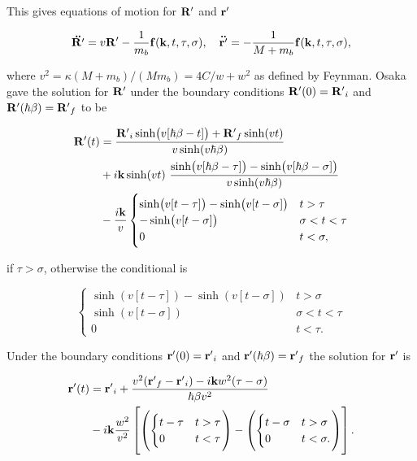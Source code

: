 This gives equations of motion for $\vb{R'}$ and $\vb{r'}$

\begin{equation}\label{eqn:osaka_rel}
    \vb{\ddot{R'}} = v\vb{R'} - \frac{1}{m_b} \vb{f}(\vb{k}, t, \tau, \sigma), \quad \vb{\ddot{r'}} = -\frac{1}{M+m_b} \vb{f}(\vb{k}, t, \tau, \sigma),
\end{equation}

where $v^2 = \kappa (M+m_b) / (M m_b) = 4C/w + w^2$ as defined by Feynman. Osaka gave the solution for $\vb{R'}$ under the boundary conditions $\vb{R'}(0) = \vb{R'}_i$ and $\vb{R'}(\hbar \beta) = \vb{R'}_f$ to be

\begin{equation}
    \begin{aligned}
    \vb{R'}(t) &= \frac{\vb{R'}_i \sinh (v[\hbar\beta - t]) + \vb{R'}_f \sinh(vt)}{v\sinh(v\hbar\beta)} \\
    &+ i\vb{k} \sinh(vt)\ \frac{\sinh(v[\hbar\beta - \tau]) - \sinh(v[\hbar\beta - \sigma])}{v\sinh(v\hbar\beta)} \\
    &- \frac{i\vb{k}}{v}
    \begin{cases}
        \sinh(v[t-\tau]) - \sinh(v[t-\sigma]) & t > \tau \\
        -\sinh(v[t-\sigma]) & \sigma < t < \tau \\
        0 & t < \sigma,
    \end{cases}
    \end{aligned}
\end{equation}

if $\tau > \sigma$, otherwise the conditional is

\begin{equation}
    \begin{cases}
        \sinh(v[t-\tau]) - \sinh(v[t-\sigma]) & t > \sigma \\
        \sinh(v[t-\sigma]) & \sigma < t < \tau \\
        0 & t < \tau.
    \end{cases}
\end{equation}

Under the boundary conditions $\vb{r'}(0) = \vb{r'}_i$ and $\vb{r'}(\hbar\beta) = \vb{r'}_f$ the solution for $\vb{r'}$ is

\begin{equation}
    \begin{aligned}
    \vb{r'}(t) &= \vb{r'}_i + \frac{v^2 (\vb{r'}_f - \vb{r'}_i) - i\vb{k}w^2 (\tau - \sigma)}{\hbar\beta v^2} \\
    &- i\vb{k}\frac{w^2}{v^2} \left[
    \left(\begin{cases}
        t - \tau & t > \tau \\
        0 & t < \tau
    \end{cases}\right) - 
    \left(\begin{cases}
        t - \sigma & t > \sigma \\
        0 & t < \sigma.
    \end{cases}\right)
    \right].
    \end{aligned}
\end{equation}

